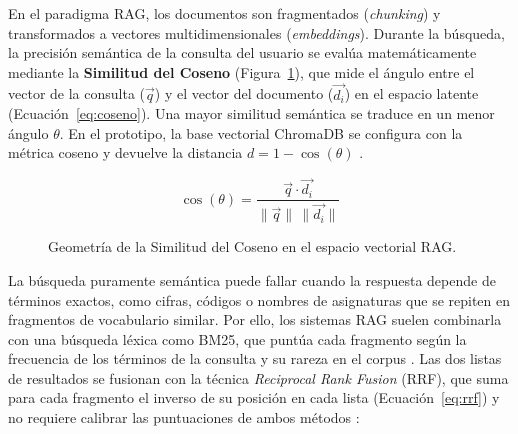 En el paradigma RAG, los documentos son fragmentados (\textit{chunking}) y transformados a vectores multidimensionales (\textit{embeddings}). Durante la búsqueda, la precisión semántica de la consulta del usuario se evalúa matemáticamente mediante la \textbf{Similitud del Coseno} (Figura~\ref{fig:coseno_rag}), que mide el ángulo entre el vector de la consulta ($\vec{q}$) y el vector del documento ($\vec{d_i}$) en el espacio latente (Ecuación~\ref{eq:coseno}). Una mayor similitud semántica se traduce en un menor ángulo $\theta$. En el prototipo, la base vectorial ChromaDB se configura con la métrica coseno y devuelve la distancia $d = 1 - \cos(\theta)$ \cite{chroma2024,reimers2019sbert}.

\begin{equation}
\label{eq:coseno}
\cos(\theta) = \frac{\vec{q} \cdot \vec{d_i}}{\lVert \vec{q} \rVert \, \lVert \vec{d_i} \rVert}
\end{equation}

\begin{figure}[htbp]
\centering
{}
\caption{Geometría de la Similitud del Coseno en el espacio vectorial RAG.}
\label{fig:coseno_rag}
\elaboradopor{\autorTFG}
\end{figure}

La búsqueda puramente semántica puede fallar cuando la respuesta depende de términos exactos, como cifras, códigos o nombres de asignaturas que se repiten en fragmentos de vocabulario similar. Por ello, los sistemas RAG suelen combinarla con una búsqueda léxica como BM25, que puntúa cada fragmento según la frecuencia de los términos de la consulta y su rareza en el corpus \cite{robertson2009bm25}. Las dos listas de resultados se fusionan con la técnica \textit{Reciprocal Rank Fusion} (RRF), que suma para cada fragmento el inverso de su posición en cada lista (Ecuación~\ref{eq:rrf}) y no requiere calibrar las puntuaciones de ambos métodos \cite{cormack2009rrf}:

